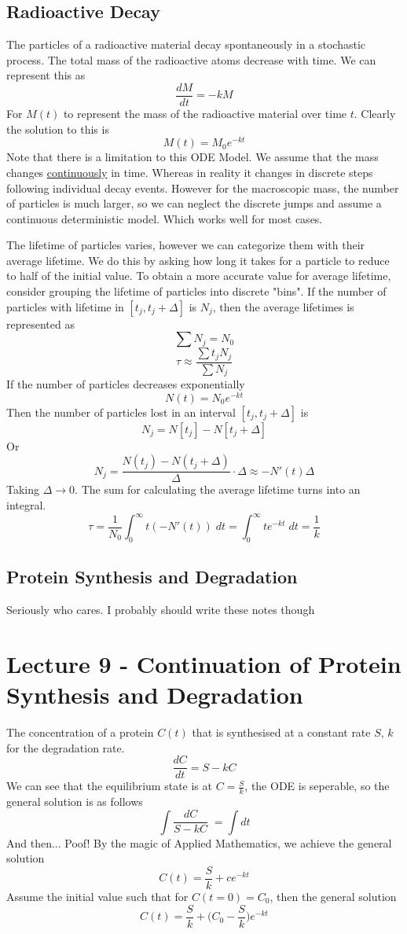 \documentclass[a6paper]{article}
\theoremstyle{definition}
\theoremstyle{plain}
\theoremstyle{remark}
\begin{document}
\subsection{Radioactive Decay}
The particles of a radioactive material decay spontaneously in a stochastic
process. The total mass of the radioactive atoms decrease with time. We can represent this as 
$$ \frac{dM}{dt} = -kM $$
For $ M(t) $ to represent the mass of the radioactive material over time $ t $.
\noindent
Clearly the solution to this is 
$$ M(t) = M_0 e^{-kt} $$
Note that there is a limitation to this ODE Model. We assume that the mass changes \underline{continuously} in time. Whereas in reality it 
changes in discrete steps following individual decay events. However 
for the macroscopic mass, the number of particles is much larger, so we can neglect the discrete jumps and assume a continuous deterministic model. Which works well for most cases.
\\ \par
The lifetime of particles varies, however we can categorize them
with their average lifetime. We do this by asking how long it
takes for a particle to reduce to half of the initial value.
To obtain a more accurate value for average lifetime, consider
grouping the lifetime of particles into discrete "bins". If the
number of particles with lifetime in $ [t_j, t_j + \Delta] $
is $ N_j $, then the average lifetimes is represented as
$$ \sum N_j = N_0 $$
$$ \tau \approx \frac{ \displaystyle \sum t_j N_j}{\displaystyle \sum N_j} $$
If the number of particles decreases exponentially
$$ N(t) = N_0 e^{-kt} $$
Then the number of particles lost in an interval $ [t_j, t_j + \Delta] $ is 
$$ N_j = N[t_j] - N[t_j + \Delta] $$
Or
$$ N_j = \frac{N(t_j) - N(t_j + \Delta)}{\Delta} \cdot \Delta
\approx - N'(t)\Delta$$
Taking $ \Delta \to 0 $. The sum for calculating the average lifetime turns into an integral.
$$ \tau = \frac{1}{N_0} \int_0^\infty  t(-N'(t)) \; dt = 
\int_0^\infty te^{-kt} \; dt = \frac{1}{k}$$
\subsection{Protein Synthesis and Degradation}
Seriously who cares. I probably should write these notes though
\section{Lecture 9 - Continuation of Protein Synthesis and Degradation}
The concentration of a protein $ C(t) $ that is synthesised at a constant rate
$ S $, $ k $ for the degradation rate.
$$ \frac{dC}{dt} = S - kC $$
We can see that the equilibrium state is at $ C = \frac{S}{k} $, the ODE is
seperable, so the general solution is as follows
$$ \int \frac{dC}{S-kC} \; = \int dt $$
And then... Poof! By the magic of Applied Mathematics, we achieve the general
solution
$$ C(t) = \frac{S}{k} + ce^{-kt} $$
Assume the initial value such that for $ C(t=0) = C_0 $, then the general
solution
$$ C(t) = \frac{S}{k} + \Big (C_0 - \frac{S}{k} \Big) e^{-kt} $$
\end{document}
